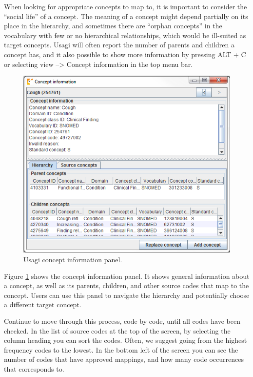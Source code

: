 \documentclass[11pt]{book}
\theoremstyle{definition}
\theoremstyle{definition}
\theoremstyle{definition}
\theoremstyle{remark}
\begin{document}
When looking for appropriate concepts to map to, it is important to
consider the ``social life'' of a concept. The meaning of a concept
might depend partially on its place in the hierarchy, and sometimes
there are ``orphan concepts'' in the vocabulary with few or no
hierarchical relationships, which would be ill-suited as target
concepts. Usagi will often report the number of parents and children a
concept has, and it also possible to show more information by pressing
ALT + C or selecting view --\textgreater{} Concept information in the
top menu bar.

\begin{figure}

{\centering \includegraphics[width=1\linewidth]{images/ExtractTransformLoad/usagiConceptInfo} 

}

\caption{Usagi concept information panel.}\label{fig:usagiConceptInfo}
\end{figure}

Figure \ref{fig:usagiConceptInfo} shows the concept information panel.
It shows general information about a concept, as well as its parents,
children, and other source codes that map to the concept. Users can use
this panel to navigate the hierarchy and potentially choose a different
target concept.

Continue to move through this process, code by code, until all codes
have been checked. In the list of source codes at the top of the screen,
by selecting the column heading you can sort the codes. Often, we
suggest going from the highest frequency codes to the lowest. In the
bottom left of the screen you can see the number of codes that have
approved mappings, and how many code occurrences that corresponds to.
\end{document}

